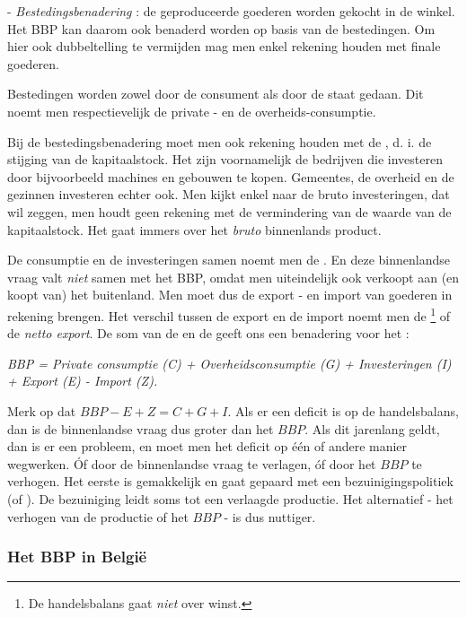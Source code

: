 \par - \textit{Bestedingsbenadering} : de geproduceerde goederen worden gekocht in de winkel. Het BBP kan daarom ook benaderd worden op basis van de bestedingen. Om hier ook dubbeltelling te vermijden mag men enkel rekening houden met finale goederen.
\par Bestedingen worden zowel door de consument als door de staat gedaan. Dit noemt men respectievelijk de private - en de overheids-consumptie.
\par Bij de bestedingsbenadering moet men ook rekening houden met de , d. i. de stijging van de kapitaalstock. Het zijn voornamelijk de bedrijven die investeren door bijvoorbeeld machines en gebouwen te kopen. Gemeentes, de overheid en de gezinnen investeren echter ook. Men kijkt enkel naar de bruto investeringen, dat wil zeggen, men houdt geen rekening met de vermindering van de waarde van de kapitaalstock. Het gaat immers over het \textit{bruto} binnenlands product.
\par De consumptie en de investeringen samen noemt men de . En deze binnenlandse vraag valt \textit{niet} samen met het BBP, omdat men uiteindelijk ook verkoopt aan (en koopt van) het buitenland. Men moet dus de export - en import van goederen in rekening brengen. Het verschil tussen de export en de import noemt men de \footnote{De handelsbalans gaat \textit{niet} over winst.} of de \textit{netto export}. De som van de  en de  geeft ons een benadering voor het  :

\begin{leftbar}\noindent\textit{BBP = Private consumptie (C) + Overheidsconsumptie (G) + Investeringen (I) + Export (E) - Import (Z).}\end{leftbar}

Merk op dat $BBP-E+Z=C+G+I$. Als er een deficit is op de handelsbalans, dan is de binnenlandse vraag dus groter dan het $BBP$. Als dit jarenlang geldt, dan is er een probleem, en moet men het deficit op \'e\'en of andere manier wegwerken. \'Of door de binnenlandse vraag te verlagen, \'of door het $BBP$ te verhogen. Het eerste is gemakkelijk en gaat gepaard met een bezuinigingspolitiek (of ). De bezuiniging leidt soms tot een verlaagde productie. Het alternatief - het verhogen van de productie of het $BBP$ - is dus nuttiger.

\subsubsection{Het BBP in Belgi\"e}

